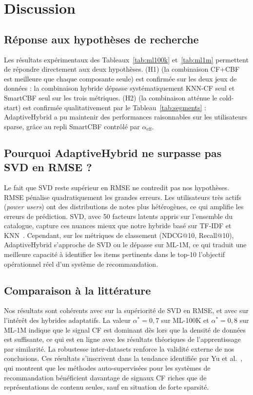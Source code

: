 \documentclass[conference]{IEEEtran}
\begin{document}
\section{Discussion}
\label{sec:discussion}

\subsection{Réponse aux hypothèses de recherche}

Les résultats expérimentaux des Tableaux~\ref{tab:ml100k} et~\ref{tab:ml1m}
permettent de répondre directement aux deux hypothèses. (H1) (la combinaison
CF+CBF est meilleure que chaque composante seule) est confirmée sur les deux
jeux de données : la combinaison hybride dépasse systématiquement KNN-CF seul
et SmartCBF seul sur les trois métriques. (H2) (la combinaison atténue le
cold-start) est confirmée qualitativement par le Tableau~\ref{tab:segments} :
AdaptiveHybrid a pu maintenir des performances raisonnables
sur les utilisateurs sparse, grâce au repli SmartCBF contrôlé par
$\alpha_{\text{eff}}$.

\subsection{Pourquoi AdaptiveHybrid ne surpasse pas SVD en RMSE ?}

Le fait que SVD reste supérieur en RMSE ne contredit pas nos hypothèses. RMSE
pénalise quadratiquement les grandes erreurs. Les utilisateurs très actifs
(\textit{power users}) ont des distributions de notes plus hétérogènes, ce
qui amplifie les erreurs de prédiction. SVD, avec 50 facteurs latents appris
sur l'ensemble du catalogue, capture ces nuances mieux que notre hybride basé
sur TF-IDF et KNN~\cite{koren2009}. Cependant, sur les métriques de classement
(NDCG@10, Recall@10), AdaptiveHybrid s'approche de SVD ou le dépasse sur
ML-1M, ce qui traduit une meilleure capacité à identifier les items pertinents
dans le top-10 l'objectif opérationnel réel d'un système de recommandation.

\subsection{Comparaison à la littérature}

Nos résultats sont cohérents avec \cite{koren2009} sur la supériorité de SVD
en RMSE, et avec \cite{burke2002,claypool1999} sur l'intérêt des hybrides
adaptatifs. La valeur $\alpha^*=0{,}7$ sur ML-100K et $\alpha^*=0{,}8$ sur
ML-1M indique que le signal CF est dominant dès lors que la densité de données
est suffisante, ce qui est en ligne avec les résultats théoriques de
l'apprentissage par similarité. La robustesse inter-datasets renforce la
validité externe de nos conclusions. Ces résultats s'inscrivent dans la
tendance identifiée par Yu et al.~\cite{yu2023}, qui montrent que les méthodes
auto-supervisées pour les systèmes de recommandation bénéficient davantage
de signaux CF riches que de représentations de contenu seules, sauf en
situation de forte sparsité.
\end{document}
